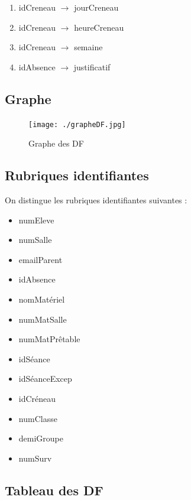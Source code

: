 \documentclass[12pt,french,titlepage]{article}
\begin{document}
\begin{enumerate}
\item idCreneau $\rightarrow$ jourCreneau   
\item	 idCreneau $\rightarrow$ heureCreneau   
\item	 idCreneau $\rightarrow$ semaine  

\item idAbsence $\rightarrow$ justificatif
      \end{enumerate}
      
      \subsection{Graphe}
      
      \begin{figure}[H]
      	\centering
      	\texttt{[image: ./grapheDF.jpg]}
      	\caption{Graphe des DF}
      \end{figure}
  
      \subsection{Rubriques identifiantes}
      
      On distingue les rubriques identifiantes suivantes :
      
      \begin{itemize}
          \item numEleve
          \item numSalle
          \item emailParent
          \item idAbsence
          \item nomMatériel
          \item numMatSalle
          \item numMatPrêtable
          \item idSéance
          \item idSéanceExcep
          \item idCréneau
          \item numClasse
          \item demiGroupe
          \item numSurv
          
      \end{itemize}

    \subsection{Tableau des DF}
    
\end{document}
